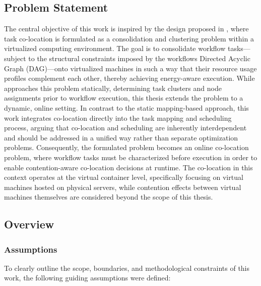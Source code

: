 \subsection{Problem Statement}
\label{sec:problem_statement}
The central objective of this work is inspired by the design proposed in \cite{5644899}, where task co-location is formulated as a consolidation and clustering problem within a virtualized computing environment. The goal is to consolidate workflow tasks—subject to the structural constraints imposed by the workflows Directed Acyclic Graph (DAG)—onto virtualized machines in such a way that their resource usage profiles complement each other, thereby achieving energy-aware execution. While \cite{5644899} approaches this problem statically, determining task clusters and node assignments prior to workflow execution, this thesis extends the problem to a dynamic, online setting.
In contrast to the static mapping-based approach, this work integrates co-location directly into the task mapping and scheduling process, arguing that co-location and scheduling are inherently interdependent and should be addressed in a unified way rather than separate optimization problems. Consequently, the formulated problem becomes an online co-location problem, where workflow tasks must be characterized before execution in order to enable contention-aware co-location decisions at runtime. The co-location in this context operates at the virtual container level, specifically focusing on virtual machines hosted on physical servers, while contention effects between virtual machines themselves are considered beyond the scope of this thesis.

\subsection{Overview}
\label{sec:overview}
\subsubsection{Assumptions}
\label{sec:assumptions}
To clearly outline the scope, boundaries, and methodological constraints of this work, the following guiding assumptions were defined:

